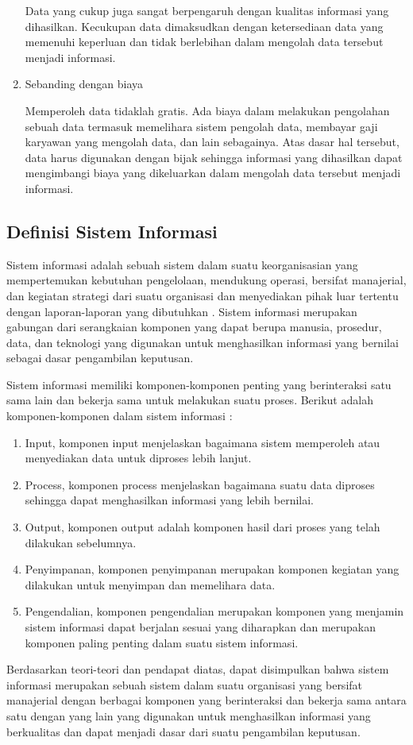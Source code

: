 \begin{enumerate}
	Data yang cukup juga sangat berpengaruh dengan kualitas informasi yang dihasilkan. Kecukupan data dimaksudkan dengan ketersediaan data yang memenuhi keperluan dan tidak berlebihan dalam mengolah data tersebut menjadi informasi.

	\item Sebanding dengan biaya

	Memperoleh data tidaklah gratis. Ada biaya dalam melakukan pengolahan sebuah data termasuk memelihara sistem pengolah data, membayar gaji karyawan yang mengolah data, dan lain sebagainya. Atas dasar hal tersebut, data harus digunakan dengan bijak sehingga informasi yang dihasilkan dapat mengimbangi biaya yang dikeluarkan dalam mengolah data tersebut menjadi informasi.
\end{enumerate}

\subsection{Definisi Sistem Informasi}
	Sistem informasi adalah sebuah sistem dalam suatu keorganisasian yang mempertemukan kebutuhan pengelolaan, mendukung operasi, bersifat manajerial, dan kegiatan strategi dari suatu organisasi dan menyediakan pihak luar tertentu dengan laporan-laporan yang dibutuhkan \citep{Hutahaean2015}. Sistem informasi merupakan gabungan dari serangkaian komponen yang dapat berupa manusia, prosedur, data, dan teknologi yang digunakan untuk menghasilkan informasi yang bernilai sebagai dasar pengambilan keputusan.

	Sistem informasi memiliki komponen-komponen penting yang berinteraksi satu sama lain dan bekerja sama untuk melakukan suatu proses. Berikut adalah komponen-komponen dalam sistem informasi \citep{Jogiyanto2005}:

\begin{enumerate}

	\item Input, komponen input menjelaskan bagaimana sistem memperoleh atau menyediakan data untuk diproses lebih lanjut.
	\item Process, komponen process menjelaskan bagaimana suatu data diproses sehingga dapat menghasilkan informasi yang lebih bernilai.
	\item Output, komponen output adalah komponen hasil dari proses yang telah dilakukan sebelumnya.
	\item Penyimpanan, komponen penyimpanan merupakan komponen kegiatan yang dilakukan untuk menyimpan dan memelihara data.
	\item Pengendalian, komponen pengendalian merupakan komponen yang menjamin sistem informasi dapat berjalan sesuai yang diharapkan dan merupakan komponen paling penting dalam suatu sistem informasi.
\end{enumerate}
	Berdasarkan teori-teori dan pendapat diatas, dapat disimpulkan bahwa sistem informasi merupakan sebuah sistem dalam suatu organisasi yang bersifat manajerial dengan berbagai komponen yang berinteraksi dan bekerja sama antara satu dengan yang lain yang digunakan untuk menghasilkan informasi yang berkualitas dan dapat menjadi dasar dari suatu pengambilan keputusan.


